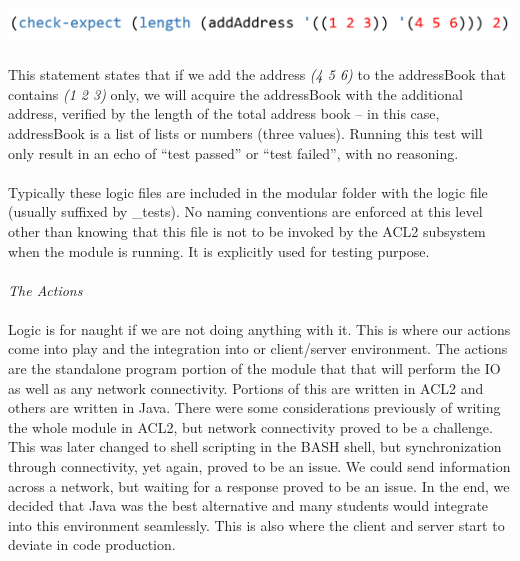 \documentclass[11pt, letterpaper]{report}
\begin{document}
\begin{description}
\includegraphics[scale=0.3]{chkex}\\\\
This statement states  that if we add the address \textit{(4 5 6)} to the addressBook that contains \textit{(1 2 3)} only, we will acquire the addressBook with the additional address, verified by the length of the total address book – in this case, addressBook is a list of lists or numbers (three values).  Running this test will only result in an echo of ``test passed'' or ``test failed'', with no reasoning.\\\\
Typically these logic files are included in the modular folder with the logic file (usually suffixed by \_tests).  No naming conventions are enforced at this level other than knowing that this file is not to be invoked by the ACL2 subsystem when the module is running.  It is explicitly used for testing purpose.
\\\\
\textit{The Actions}\\\\
Logic is for naught if we are not doing anything with it.  This is where our actions come into play and the integration into or client/server environment.  The actions are the standalone program portion of the module that that will perform the IO as well as any network connectivity.  Portions of this are written in ACL2 and others are written in Java.  There were some considerations previously of writing the whole module in ACL2, but network connectivity proved to be a challenge.  This was later changed to shell scripting in the BASH shell, but synchronization through connectivity, yet again, proved to be an issue.  We could send information across a network, but waiting for a response proved to be an issue.  In the end, we decided that Java was the best alternative and many students would integrate into this environment seamlessly.  This is also where the client and server start to deviate in code production.\\


\end{description}
\end{document}
